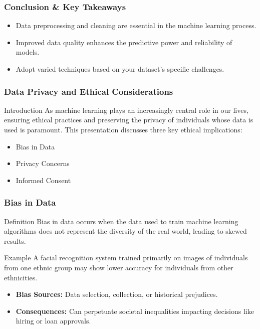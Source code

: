 \documentclass[aspectratio=169]{beamer}
\begin{document}
\begin{frame}[fragile]
    \frametitle{Conclusion & Key Takeaways}
    \begin{itemize}
        \item Data preprocessing and cleaning are essential in the machine learning process.
        \item Improved data quality enhances the predictive power and reliability of models.
        \item Adopt varied techniques based on your dataset's specific challenges.
    \end{itemize}
\end{frame}

\begin{frame}[fragile]
    \frametitle{Data Privacy and Ethical Considerations}
    \begin{block}{Introduction}
        As machine learning plays an increasingly central role in our lives, ensuring ethical practices and preserving the privacy of individuals whose data is used is paramount. This presentation discusses three key ethical implications:
        \begin{itemize}
            \item Bias in Data
            \item Privacy Concerns
            \item Informed Consent
        \end{itemize}
    \end{block}
\end{frame}

\begin{frame}[fragile]
    \frametitle{Bias in Data}
    \begin{block}{Definition}
        Bias in data occurs when the data used to train machine learning algorithms does not represent the diversity of the real world, leading to skewed results.
    \end{block}

    \begin{block}{Example}
        A facial recognition system trained primarily on images of individuals from one ethnic group may show lower accuracy for individuals from other ethnicities.
    \end{block}

    \begin{itemize}
        \item \textbf{Bias Sources:} Data selection, collection, or historical prejudices.
        \item \textbf{Consequences:} Can perpetuate societal inequalities impacting decisions like hiring or loan approvals.
    \end{itemize}
\end{frame}
\end{document}
